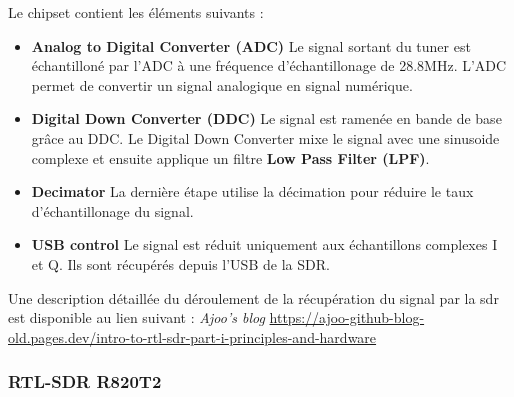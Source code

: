\vspace{0.1cm}

Le chipset contient les éléments suivants :
\begin{itemize}
\item \textbf{Analog to Digital Converter (ADC)} Le signal sortant du tuner est échantilloné par l'ADC à une fréquence d'échantillonage de 28.8MHz. L'ADC permet de convertir un signal analogique en signal numérique.
\item \textbf{Digital Down Converter (DDC)} Le signal est ramenée en bande de base grâce au DDC. Le Digital Down Converter  mixe le signal avec une sinusoide complexe et ensuite applique un filtre \textbf{Low Pass Filter (LPF)}. 
\item \textbf{Decimator} La dernière étape utilise la décimation pour réduire le taux d'échantillonage du signal.
\item \textbf{USB control} Le signal est réduit uniquement aux échantillons complexes I et Q. Ils sont récupérés depuis l'USB de la SDR.
\end{itemize}

\vspace{0.1cm}

Une description détaillée du déroulement de la récupération du signal par la sdr est disponible au lien suivant : \textit{Ajoo's blog} \href{https://ajoo-github-blog-old.pages.dev/intro-to-rtl-sdr-part-i-principles-and-hardware}{https://ajoo-github-blog-old.pages.dev/intro-to-rtl-sdr-part-i-principles-and-hardware}




\subsubsection{RTL-SDR R820T2}

